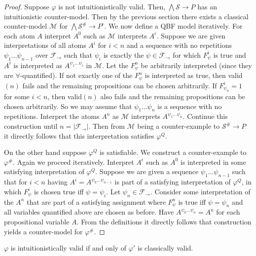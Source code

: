 \documentclass[runningheads]{llncs}
\begin{document}
\begin{proof}
Suppose $\varphi$ is not intuitionistically valid.
Then, $\bigwedge\mathcal S\to P$ has an intuitionistic counter-model. Then by the previous section there exists a classical counter-model $\mathcal M$ for $\bigwedge\mathcal S^\#\to P^\epsilon$.
We now define a QBF model iteratively.
For each atom $A$ interpret $A^0$ such as $\mathcal M$ interprets $A^\epsilon$. Suppose we are given interpretations of all atoms $A^i$ for $i < n$ and a sequence with no repetitions $\psi_1\dots\psi_{n-1}$ over $\mathcal F_\to$ such that $\psi_i$ is exactly the $\psi\in\mathcal F_\to$ for which $F_{\psi}^i$ is true and $A^i$ is interpreted as $A^{\psi_1\dots\psi_i}$  in $\mathcal M$.
Let the $F^{n}_\psi$ be arbitrarily interpreted (since they are $\forall$-quantified). If not exactly one of the $F^{n}_\psi$ is interpreted as true, then valid$(n)$ fails and the remaining propositions can be chosen arbitrarily. If $F^i_{\psi_n} = 1$ for some $i < n$, then valid$(n)$ also fails and the remaining propositions can be chosen arbitrarily.
So we may assume that $\psi_1\dots\psi_n$ is a sequence with no repetitions.
Interpret the atoms $A^n$ as $\mathcal M$ interprets $A^{\psi_1\dots\psi_n}$.
Continue this construction until $n  = |\mathcal F_\to|$. Then from $\mathcal M$ being a counter-example to $\mathcal S^\#\to P$ it directly follows that this interpretation satisfies $\varphi^Q$.
	
	On the other hand suppose $\varphi^Q$ is satisfiable. We construct a counter-example to $\varphi^\#$.
	Again we proceed iteratively. Interpret $A^\epsilon$ such as $A^0$ is interpreted in some satisfying interpretation of $\varphi^Q$. Suppose we are given a sequence $\psi_1\dots \psi_{n-1}$ such that for $i<n$ having $A^i = A^{\psi_0\dots\psi_{n-1}}$ is part of a satisfying interpretation of $\varphi^Q$, in which $F^i_\psi$ is chosen true iff $\psi = \psi_i$. Let $\psi_n\in\mathcal F_\to$. Consider some interpretation of the $A^n$ that are part of a satisfying assignment where $F^n_\psi$ is true iff $\psi = \psi_n$ and all variables quantified above are chosen as before. Have $A^{\psi_0\dots\psi_n} = A^n$ for each propositional variable $A$. From the definitions it directly follows that construction yields a counter-model for $\varphi^\#$.
\end{proof}

\begin{lemma}\label{lemma:fo-simplification}
	$\varphi$ is intuitionistically valid if and only of $\varphi'$ is classically valid.
\end{lemma}
\end{document}
